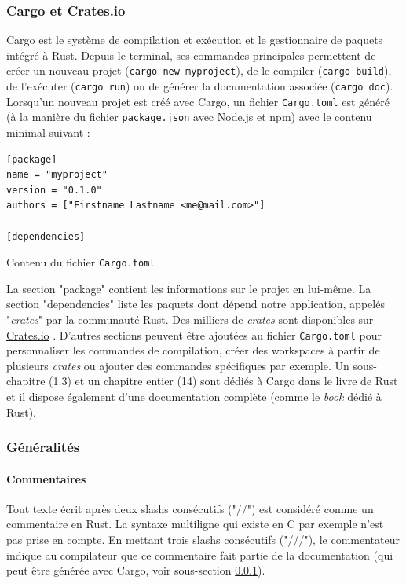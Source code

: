 \documentclass[a4paper, 12pt]{article}
\newenvironment{code}{\captionsetup{type=listing}}{}
\begin{document}
\subsubsection{Cargo et Crates.io}\label{cargo_crates}
Cargo est le système de compilation et exécution et le gestionnaire de paquets intégré à Rust.
Depuis le terminal, ses commandes principales permettent de créer un nouveau projet 
(\texttt{cargo new myproject}), de le compiler (\texttt{cargo build}), de 
l'exécuter (\texttt{cargo run}) ou de générer la documentation associée 
(\texttt{cargo doc}). Lorsqu'un nouveau projet est créé avec Cargo, un fichier 
\texttt{Cargo.toml} est généré (à la manière du fichier \texttt{package.json} 
avec Node.js et npm) avec le contenu minimal suivant :
\bigbreak
\begin{code}
    \begin{verbatim}
[package]
name = "myproject"
version = "0.1.0"
authors = ["Firstname Lastname <me@mail.com>"]

[dependencies]
    \end{verbatim}
    \caption{Contenu du fichier \texttt{Cargo.toml}}
\end{code}
\bigbreak
La section "package" contient les informations sur le projet en lui-même. La section "dependencies" 
liste les paquets dont dépend notre application, appelés "\textit{crates}" par la communauté Rust. 
Des milliers de \textit{crates} sont disponibles sur \href{https://crates.io}{Crates.io} \cite{ref33}. 
D'autres sections peuvent être ajoutées au fichier \texttt{Cargo.toml} pour personnaliser 
les commandes de compilation, créer des workspaces à partir de plusieurs \textit{crates} ou ajouter 
des commandes spécifiques par exemple.
Un sous-chapitre (1.3) et un chapitre entier (14) sont dédiés à Cargo dans le livre de Rust \cite{ref0} 
et il dispose également d'une \href{https://doc.rust-lang.org/cargo/}{documentation complète} 
\cite{ref35} (comme le \textit{book} dédié à Rust).

\subsubsection{Généralités}

\paragraph{Commentaires}
Tout texte écrit après deux slashs consécutifs ("//") est considéré comme un commentaire en Rust.
La syntaxe multiligne qui existe en C par exemple n'est pas prise en compte. En mettant trois slashs 
consécutifs ("///"), le commentateur indique au compilateur que ce commentaire fait partie de la 
documentation (qui peut être générée avec Cargo, voir sous-section \ref{cargo_crates}).
\end{document}
